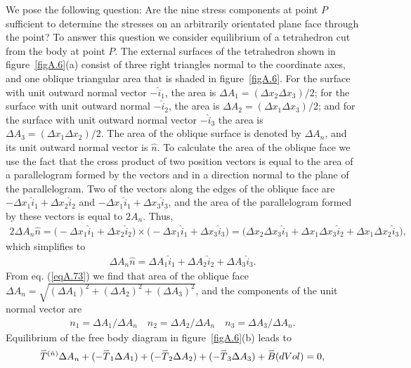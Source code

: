 \documentclass{AeroStructure-ERJohnson}
\def\harp#1{\smash{\mathord{\buildrel{\lower3pt\hbox{$\scriptscriptstyle\rightharpoonup$}}\over{#1}}}}
\begin{document}
We pose the following question: Are the nine stress components at point $P$ sufficient to determine the stresses on an arbitrarily orientated plane face through the point? To answer this question we consider equilibrium of a tetrahedron cut from the body at point $P$.  The external surfaces of the tetrahedron shown in figure~\ref{figA.6}(a) consist of three right triangles normal to the coordinate axes, and one oblique triangular area that is shaded in figure~\ref{figA.6}. For the surface with unit outward normal vector $-\hat{i}_{1}$, the area is $\Delta A_{1}=(\Delta x_{2} \Delta x_{3}) / 2$; for the surface with unit\vadjust{\pagebreak} outward normal $-\hat{i}_{2}$, the area is $\Delta A_{2}=(\Delta x_{1} \Delta x_{3}) / 2$; and for the surface with unit outward normal vector $-\hat{i}_{3}$ the area is $\Delta A_{3}=(\Delta x_{1} \Delta x_{2}) / 2$. The area of the oblique surface is denoted by $\Delta A_{n}$, and its unit outward normal vector is $\hat{n}$. To calculate the area of the oblique face we use the fact that the cross product of two position vectors is equal to the area of a parallelogram formed by the vectors and in a direction normal to the plane of the parallelogram. Two of the vectors along the edges of the oblique face are $-\Delta x_{1} \hat{i}_{1}+\Delta x_{2} \hat{i}_{2}$ and $-\Delta x_{1} \hat{i}_{1}+\Delta x_{3} \hat{i}_{3}$, and the area of the parallelogram formed by these vectors is equal to $2 A_{n}$. Thus,
\begin{align}\label{eqA.72}
2 \Delta A_{n} \hat{n}=\big(-\Delta x_{1} \hat{i}_{1}+\Delta x_{2} \hat{i}_{2}\big) \times\big(-\Delta x_{1} \hat{i}_{1}+\Delta x_{3} \hat{i}_{3}\big)=\big(\Delta x_{2} \Delta x_{3} \hat{i}_{1}+\Delta x_{1} \Delta x_{3} \hat{i}_{2}+\Delta x_{1} \Delta x_{2} \hat{i}_{3}\big),
\end{align}
which simplifies to
\begin{align}\label{eqA.73}
\Delta A_{n} \hat{n}=\Delta A_{1} \hat{i}_{1}+\Delta A_{2} \hat{i}_{2}+\Delta A_{3} \hat{i}_{3}.
\end{align}
From eq. (\ref{eqA.73}) we find that area of the oblique face $\Delta A_{n}=\sqrt{(\Delta A_{1})^{2}+(\Delta A_{2})^{2}+(\Delta A_{3})^{2}}$, and the components of the unit normal vector are
\begin{align}\label{eqA.74}
n_{1}=\Delta A_{1} / \Delta A_{n} \quad n_{2}=\Delta A_{2} / \Delta A_{n} \quad n_{3}=\Delta A_{3} / \Delta A_{n}.
\end{align}
Equilibrium of the free body diagram in figure~\ref{figA.6}(b) leads to
\begin{align}\label{eqA.75}
\harp{T}^{(\hat{n})} \Delta A_{n}+\left(-\harp{T}_{1} \Delta A_{1}\right)+\left(-\harp{T}_{2} \Delta A_{2}\right)+\left(-\harp{T}_{3} \Delta A_{3}\right)+\harp{B}(d V o l)=0,
\end{align}
\end{document}
